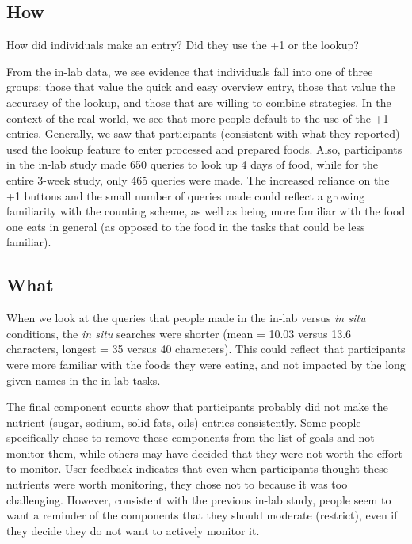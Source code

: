 \subsection{How}

How did individuals make an entry? Did they use the +1 or the lookup?

From the in-lab data, we see evidence that individuals fall into one of three groups: those that value the quick and easy overview entry, those that value the accuracy of the lookup, and those that are willing to combine strategies. In the context of the real world, we see that more people default to the use of the +1 entries. Generally, we saw that participants (consistent with what they reported) used the lookup feature to enter processed and prepared foods. Also, participants in the in-lab study made 650 queries to look up 4 days of food, while for the entire 3-week study, only 465 queries were made. The increased reliance on the +1 buttons and the small number of queries made could reflect a growing familiarity with the counting scheme, as well as being more familiar with the food one eats in general (as opposed to the food in the tasks that could be less familiar). 

\subsection{What}

When we look at the queries that people made in the in-lab versus \textit{in situ} conditions, the \textit{in situ} searches were shorter (mean = 10.03 versus 13.6 characters, longest = 35 versus 40 characters). This could reflect that participants were more familiar with the foods they were eating, and not impacted by the long given names in the in-lab tasks. 

The final component counts show that participants probably did not make the nutrient (sugar, sodium, solid fats, oils) entries consistently. Some people specifically chose to remove these components from the list of goals and not monitor them, while others may have decided that they were not worth the effort to monitor. User feedback indicates that even when participants thought these nutrients were worth monitoring, they chose not to because it was too challenging. However, consistent with the previous in-lab study, people seem to want a reminder of the components that they should moderate (restrict), even if they decide they do not want to actively monitor it. 



